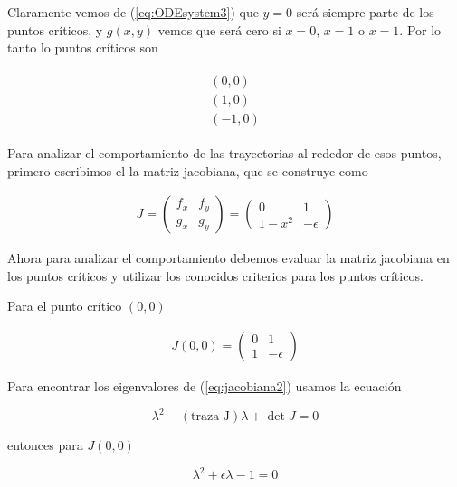 \documentclass[a4paper,10pt]{article}
\begin{document}
Claramente vemos de (\ref{eq:ODEsystem3}) que $y=0$ será siempre parte de los puntos críticos,
y $g(x,y)$ vemos que será cero si $x=0$, $x=1$ o $x=1$. Por lo tanto lo puntos críticos son

\begin{align}
 \begin{split}
  (0,0) \\
  (1,0) \\
  (-1,0) 
 \label{eq:puntoscriticos1}
 \end{split}
\end{align}

Para analizar el comportamiento de las trayectorias al rededor de esos puntos, primero escribimos 
el la matriz jacobiana, que se construye como


\begin{align}
J = \begin{pmatrix}
     f_x & f_y \\
     g_x & g_y
\end{pmatrix} = \begin{pmatrix}
		0 & 1 \\
		1- x^2 & -\epsilon
		\end{pmatrix}
\label{eq:jacobiana1}
\end{align}

Ahora para analizar el comportamiento debemos evaluar la matriz jacobiana en los puntos
críticos y utilizar los conocidos criterios para los puntos críticos.

Para el punto crítico $(0,0)$

\begin{align}
J(0,0) = \begin{pmatrix}
     0 & 1 \\
     1 & -\epsilon
\end{pmatrix}
\label{eq:jacobiana2}
\end{align}

Para encontrar los eigenvalores de (\ref{eq:jacobiana2}) usamos la ecuación

\begin{equation}
 \lambda^2 - (\text{traza J}) \lambda + \det{J} = 0
 \label{eq:calcEigenvalores}
\end{equation}

entonces para $J(0,0)$

\begin{equation}
 \lambda^2 + \epsilon \lambda - 1 = 0
\end{equation}
\end{document}
